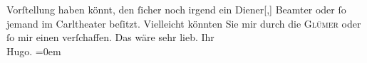 \begin{ledgroupsized}[t]{13cm}
               Vorſtellung haben könnt, den ſicher noch irgend ein Diener{[},{]}
               Beamter oder ſo jemand im Carltheater beſitzt.
               Vielleicht könnten Sie mir durch die \textsc{Glümer} oder ſo mir einen verſchaffen. Das wäre sehr lieb.\pend
           \pstart
           Ihr{\\[\baselineskip]}\spacefill\mbox{Hugo.}\pend
           \leftskip=0em{}\endnumbering{}\end{ledgroupsized}  \newcommand{\dateiname}{L00782}\newcommand{\titel}{Hugo von Hofmannsthal an Arthur Schnitzler, [10. 3. 1898?]}\newcommand{\editorInnen}{Martin Anton Müller und Gerd-Hermann Susen}
            \footnotesize
\begin{ledgroupsized}[t]{11.5cm}
\end{ledgroupsized}
         
      